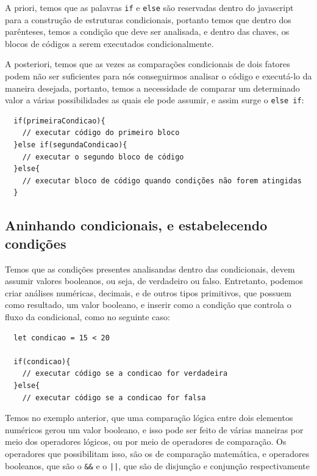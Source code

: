 \documentclass[12pt, a4paper]{paper}
\begin{document}
A priori, temos que as palavras \texttt{if} e \texttt{else} são reservadas dentro do 
javascript para a construção de estruturas condicionais, portanto
temos que dentro dos parênteses, temos a condição que deve ser analisada, 
e dentro das chaves, os blocos de códigos a serem executados condicionalmente.

A posteriori, temos que as vezes as comparações condicionais de dois fatores
podem não ser suficientes para nós conseguirmos analisar o código e executá-lo 
da maneira desejada, portanto, temos a necessidade de comparar um determinado valor 
a várias possibilidades as quais ele pode assumir, e assim surge o \texttt{else if}:

\begin{verbatim}
  if(primeiraCondicao){
    // executar código do primeiro bloco
  }else if(segundaCondicao){
    // executar o segundo bloco de código
  }else{
    // executar bloco de código quando condições não forem atingidas
  }
\end{verbatim}

\subsection{Aninhando condicionais, e estabelecendo condições} %
\label{sub:Aninhando condicionais, e estabelecendo condições}
Temos que as condições presentes analisandas dentro das condicionais,
devem assumir valores booleanos, ou seja, de verdadeiro ou falso. Entretanto,
podemos criar análises numéricas, decimais, e de outros tipos primitivos, que 
possuem como resultado, um valor booleano, e inserir como a condição que controla
o fluxo da condicional, como no seguinte caso:

\begin{verbatim}
  let condicao = 15 < 20

  if(condicao){
    // executar código se a condicao for verdadeira
  }else{
    // executar código se a condicao for falsa

\end{verbatim}

Temos no exemplo anterior, que uma comparação lógica entre dois elementos numéricos
gerou um valor booleano, e isso pode ser feito de várias maneiras por meio dos operadores lógicos, ou por meio de operadores de comparação. Os operadores que possibilitam isso, são os de comparação matemática, e operadores booleanos, que são o \texttt{\&\&} e o \texttt{||}, que são de disjunção e conjunção respectivamente
\end{document}

